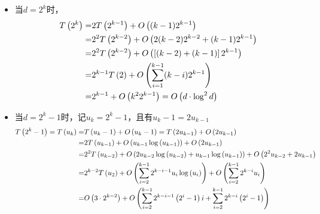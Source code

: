 \documentclass[answers]{exam}
\begin{document}
\begin{questions}
\begin{solution}
        \begin{itemize}
            \item 当$d = 2^k$时，
                  \begin{align*}
                      T\left( 2^k \right)
                      = & 2 T\left(  2^{k-1}  \right) + O\left(  (k-1)2^{k-1}  \right)                         \\
                      = & 2^2 T\left(  2^{k-2}  \right) + O\left(  2(k-2) 2^{k-2} +(k-1) 2^{k-1}  \right)      \\
                      = & 2^2 T\left(  2^{k-2}  \right) + O\left(  \left[  (k-2)+(k-1)  \right] 2^{k-1}  \right)         \\
                      = & 2^{k-1} T\left( 2 \right) + O\left(  \sum_{i=1}^{k-1} (k-i) 2^{k-1}  \right)         \\
                      = & 2^{k-1} + O\left(  k^{2} 2^{k-1}  \right) = O\left(  d \cdot \log^2 d  \right)
                  \end{align*}
            \item 当$d = 2^k - 1$时，记$u_k = 2^k - 1$，且有$u_k - 1 = 2u_{k-1}$
                  \begin{align*}
                      \pT{2^k - 1} = \pT{u_k}
                      = & \pT{ u_k-1 } + \pO{ u_k-1 } = \pT{ 2 u_{k-1} } + \pO{ 2 u_{k-1} }                                                      \\
                      = & 2 \pT{ u_{k-1} } + \pO{ u_{k-1} \log\pp{ u_{k-1} } } + \pO{ 2 u_{k-1} }                                                \\
                      = & 2^2 \pT{ u_{k-2} } + \pO{ 2 u_{k-2} \log\pp{ u_{k-2} } + u_{k-1} \log\pp{ u_{k-1} } } + \pO{ 2^2 u_{k-2} + 2 u_{k-1} } \\
                      = & 2^{k-2} \pT{ u_{2} } + \pO{ \sum_{i=2}^{k-1} 2^{k-i-1}u_{i} \log\pp{ u_{i} } } + \pO{ \sum_{i=2}^{k-1} 2^{k-i} u_{i} } \\
                      = & \pO{ 3 \cdot 2^{k-2} } + \pO{ \sum_{i=2}^{k-1} 2^{k-i-1}\pp{2^i-1} i + \sum_{i=2}^{k-1} 2^{k-i} \pp{2^i-1} }           \\

\end{align*}
\end{itemize}
\end{solution}
\end{questions}
\end{document}
